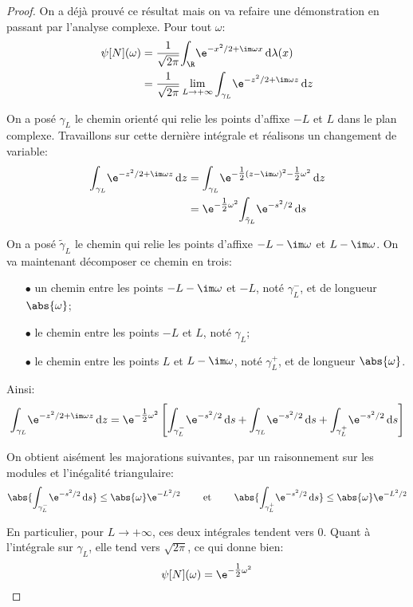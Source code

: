 \begin{proof}
On a déjà prouvé ce résultat mais on va refaire une démonstration en passant par l'analyse complexe. Pour tout $\omega$:
\begin{align*}
\psi[N](\omega) & = \frac{1}{\sqrt{2\pi}} \displaystyle{\int_{\R}} \e^{-x^2/2 + \im \omega x} \, \mathrm d \lambda(x) \\
 & = \frac{1}{\sqrt{2\pi}}\lim \limits_{L \to +\infty} \displaystyle{\int_{\gamma_L}} \e^{-z^2/2 + \im \omega z} \, \mathrm d z
\end{align*}

On a posé $\gamma_L$ le chemin orienté qui relie les points d'affixe $-L$ et $L$ dans le plan complexe. Travaillons sur cette dernière intégrale et réalisons un changement de variable:
\begin{align*}
\displaystyle{\int_{\gamma_L}} \e^{-z^2/2 + \im \omega z} \, \mathrm d z & = \displaystyle{\int_{\gamma_L}} \e^{-\tfrac{1}{2} (z-\im \omega)^2 - \tfrac{1}{2} \omega^2} \, \mathrm d z \\
 & = \e^{- \tfrac{1}{2} \omega^2} \displaystyle{\int_{\tilde{\gamma}_L}} \e^{-s^2/2} \, \mathrm d s
\end{align*}

On a posé $\tilde{\gamma}_L$ le chemin qui relie les points d'affixe $-L - \im \omega$ et $L - \im \omega$. On va maintenant décomposer ce chemin en trois:
\begin{itemize}
\item[$\bullet$] 
un chemin entre les points $-L - \im \omega$ et $-L$, noté $\gamma^-_L$, et de longueur $\abs{\omega}$;
\item[$\bullet$] 
le chemin entre les points $-L$ et $L$, noté $\gamma_L$;
\item[$\bullet$] 
le chemin entre les points $L$ et $L - \im \omega$, noté $\gamma^+_L$, et de longueur $\abs{\omega}$.
\end{itemize}

Ainsi:
\[
\displaystyle{\int_{\gamma_L}} \e^{-z^2/2 + \im \omega z} \, \mathrm d z  = \e^{- \tfrac{1}{2} \omega^2} \left [ \displaystyle{\int_{\gamma^-_L}} \e^{-s^2/2} \, \mathrm d s + \displaystyle{\int_{\gamma_L}} \e^{-s^2/2} \, \mathrm d s + \displaystyle{\int_{\gamma^+_L}} \e^{-s^2/2} \, \mathrm d s \right ]
\]


On obtient aisément les majorations suivantes, par un raisonnement sur les modules et l'inégalité triangulaire:
\[
\abs{\displaystyle{\int_{\gamma^-_L}} \e^{-s^2/2} \, \mathrm d s} \leq \abs{\omega} \e^{-L^2/2} \qquad \text{ et } \qquad \abs{\displaystyle{\int_{\gamma^+_L}} \e^{-s^2/2} \, \mathrm d s} \leq \abs{\omega} \e^{-L^2/2}
\]

En particulier, pour $L \to +\infty$, ces deux intégrales tendent vers $0$. Quant à l'intégrale sur $\gamma_L$, elle tend vers $\sqrt{2\pi}$, ce qui donne bien:
\[
\psi[N](\omega) = \e^{- \tfrac{1}{2} \omega^2}
\]
\end{proof}


